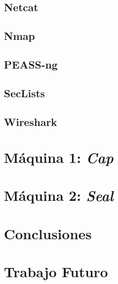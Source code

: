 \documentclass[a4paper, 12pt]{article} %
\begin{document}
\begin{otherlanguage}{spanish}
    \subsection{Netcat}
    

    \subsection{Nmap}
    

    \subsection{PEASS-ng}
    

    \subsection{SecLists}
    

    \subsection{Wireshark}
    

    \newpage
    \section{Máquina 1: \textit{Cap}}
    

    \newpage
    \section{Máquina 2: \textit{Seal}}
    

    \newpage
    \section{Conclusiones}
    

    \newpage
    \section{Trabajo Futuro}
    

    \newpage
    \printbibliography[heading=bibnumbered] %

\end{otherlanguage}
\end{document}
